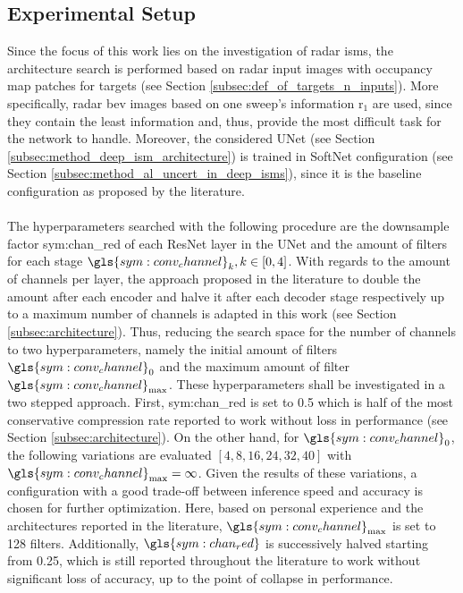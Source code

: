 \subsection{Experimental Setup}
\label{subsec:exp_setup_unet_arch}
Since the focus of this work lies on the investigation of radar \gls{ism}s, the architecture search is performed based on radar input images with occupancy map patches for targets (see Section \ref{subsec:def_of_targets_n_inputs}). More specifically, radar \gls{bev} images based on one sweep's information \gls{r}$_{1}$ are used, since they contain the least information and, thus, provide the most difficult task for the network to handle. Moreover, the considered UNet (see Section \ref{subsec:method_deep_ism_architecture}) is trained in SoftNet configuration (see Section \ref{subsec:method_al_uncert_in_deep_isms}), since it is the baseline configuration as proposed by the literature.
\\\\
The hyperparameters searched with the following procedure are the downsample factor \gls{sym:chan_red} of each ResNet layer in the UNet and the amount of filters for each stage $\gls{sym:conv_channel}_k, k \in [0,4]$. With regards to the amount of channels per layer, the approach proposed in the literature to double the amount after each encoder and halve it after each decoder stage respectively up to a maximum number of channels is adapted in this work (see Section \ref{subsec:architecture}). Thus, reducing the search space for the number of channels to two hyperparameters, namely the initial amount of filters $\gls{sym:conv_channel}_0$ and the maximum amount of filter $\gls{sym:conv_channel}_{\max}$. These hyperparameters shall be investigated in a two stepped approach. First, \gls{sym:chan_red} is set to 0.5 which is half of the most conservative compression rate reported to work without loss in performance (see Section \ref{subsec:architecture}). On the other hand, for $\gls{sym:conv_channel}_0$, the following variations are evaluated $[4,8,16,24,32,40]$ with $\gls{sym:conv_channel}_{\max} = \infty$. Given the results of these variations, a configuration with a good trade-off between inference speed and accuracy is chosen for further optimization. Here, based on personal experience and the architectures reported in the literature, $\gls{sym:conv_channel}_{\max}$ is set to 128 filters. Additionally, $\gls{sym:chan_red}$ is successively halved starting from 0.25, which is still reported throughout the literature to work without significant loss of accuracy, up to the point of collapse in performance.
